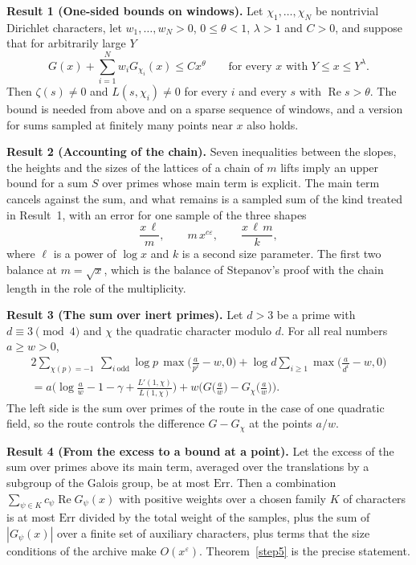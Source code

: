 \documentclass[11pt,letterpaper]{article}
\numberwithin{equation}{section}
\begin{document}
\medskip
\noindent\textbf{Result 1 (One-sided bounds on windows).}
Let $\chi_1,\dots,\chi_N$ be nontrivial Dirichlet characters, let $w_1,\dots,w_N>0$, $0\le\theta<1$, $\lambda>1$ and $C>0$, and suppose that for arbitrarily large $Y$
\begin{equation}\label{eq:intro-window}
G(x)+\sum_{i=1}^Nw_iG_{\chi_i}(x)\le Cx^\theta\qquad\text{for every }x\text{ with }Y\le x\le Y^\lambda .
\end{equation}
Then $\zeta(s)\ne0$ and $L(s,\chi_i)\ne0$ for every $i$ and every $s$ with $\operatorname{Re}s>\theta$. The bound is needed from above and on a sparse sequence of windows, and a version for sums sampled at finitely many points near $x$ also holds.

\medskip
\noindent\textbf{Result 2 (Accounting of the chain).}
Seven inequalities between the slopes, the heights and the sizes of the lattices of a chain of $m$ lifts imply an upper bound for a sum $S$ over primes whose main term is explicit. The main term cancels against the sum, and what remains is a sampled sum of the kind treated in Result~1, with an error for one sample of the three shapes
\[
\frac{x\,\ell}{m},\qquad m\,x^{c\varepsilon},\qquad\frac{x\,\ell\,m}{k},
\]
where $\ell$ is a power of $\log x$ and $k$ is a second size parameter. The first two balance at $m=\sqrt x$, which is the balance of Stepanov's proof with the chain length in the role of the multiplicity.

\medskip
\noindent\textbf{Result 3 (The sum over inert primes).}
Let $d>3$ be a prime with $d\equiv3\pmod4$ and $\chi$ the quadratic character modulo $d$. For all real numbers $a\ge w>0$,
\begin{multline}\label{eq:intro-inert}
2\sum_{\chi(p)=-1}\ \sum_{i\ \mathrm{odd}}\log p\,\max\Big(\frac a{p^i}-w,0\Big)+\log d\sum_{i\ge1}\max\Big(\frac a{d^i}-w,0\Big)\\
=a\Big(\log\frac aw-1-\gamma+\frac{L'(1,\chi)}{L(1,\chi)}\Big)+w\Big(G\Big(\frac aw\Big)-G_\chi\Big(\frac aw\Big)\Big).
\end{multline}
The left side is the sum over primes of the route in the case of one quadratic field, so the route controls the difference $G-G_\chi$ at the points $a/w$.

\medskip
\noindent\textbf{Result 4 (From the excess to a bound at a point).}
Let the excess of the sum over primes above its main term, averaged over the translations by a subgroup of the Galois group, be at most $\mathrm{Err}$. Then a combination $\sum_{\psi\in K}c_\psi\operatorname{Re}G_\psi(x)$ with positive weights over a chosen family $K$ of characters is at most $\mathrm{Err}$ divided by the total weight of the samples, plus the sum of $|G_\psi(x)|$ over a finite set of auxiliary characters, plus terms that the size conditions of the archive make $O(x^{\varepsilon})$. Theorem~\ref{step5} is the precise statement.
\end{document}
